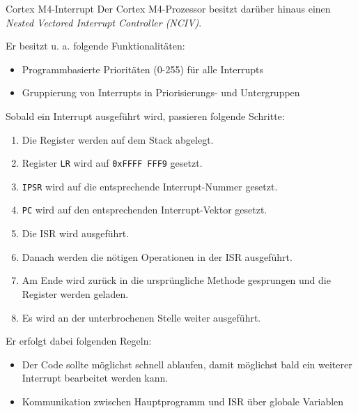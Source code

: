 \begin{defi}{Cortex M4-Interrupt}
    Der Cortex M4-Prozessor besitzt darüber hinaus einen \emph{Nested Vectored Interrupt Controller (NCIV)}.

    Er besitzt u. a. folgende Funktionalitäten:
    \begin{itemize}
        \item Programmbasierte Prioritäten (0-255) für alle Interrupts
        \item Gruppierung von Interrupts in Priorisierungs- und Untergruppen
    \end{itemize}

    Sobald ein Interrupt ausgeführt wird, passieren folgende Schritte:
    \begin{enumerate}
        \item Die Register werden auf dem Stack abgelegt.
        \item Register \texttt{LR} wird auf \texttt{0xFFFF FFF9} gesetzt.
        \item \texttt{IPSR} wird auf die entsprechende Interrupt-Nummer gesetzt.
        \item \texttt{PC} wird auf den entsprechenden Interrupt-Vektor gesetzt.
        \item Die ISR wird ausgeführt.
        \item Danach werden die nötigen Operationen in der ISR ausgeführt.
        \item Am Ende wird zurück in die ursprüngliche Methode gesprungen und die Register werden geladen.
        \item Es wird an der unterbrochenen Stelle weiter ausgeführt.
    \end{enumerate}

    Er erfolgt dabei folgenden Regeln:
    \begin{itemize}
        \item Der Code sollte möglichst schnell ablaufen, damit möglichst bald ein weiterer Interrupt bearbeitet werden kann.
        \item Kommunikation zwischen Hauptprogramm und ISR über globale Variablen
    \end{itemize}
\end{defi}

